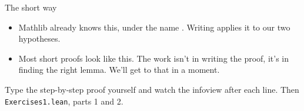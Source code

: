 \documentclass[10pt, aspectratio=169]{beamer}
\begin{document}
\begin{frame}[fragile]{The short way}
\begin{itemize}
\item Mathlib already knows this, under the name . Writing  applies it to our two hypotheses.
\item Most short proofs look like this. The work isn't in writing the proof, it's in finding the right lemma. We'll get to that in a moment.
\end{itemize}

\vspace{0.4em}
\begin{athome}
Type the step-by-step proof yourself and watch the infoview after each line. Then \texttt{Exercises1.lean}, parts 1 and 2.
\end{athome}
\end{frame}
\end{document}

